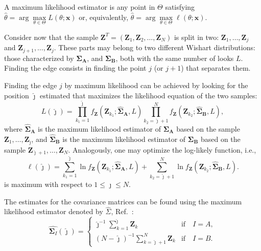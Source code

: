 \documentclass[conference]{IEEEtran}
\begin{document}
A maximum likelihood estimator is any point in $\Theta$ satisfying $\widehat{\theta}= \arg\max\limits_{\theta\in\Theta}L(\theta;\mathbf{x})$ or, equivalently, $\widehat{\theta}= \arg\max\limits_{\theta\in\Theta}\ell(\theta;\mathbf{x})$.

Consider now that the sample $\mathbf{Z}^T=(\mathbf{Z}_1,\mathbf{Z}_2,\dots,\mathbf{Z}_N)$ is split in two: $\mathbf{Z}_1,\dots,\mathbf{Z}_j$ and $\mathbf{Z}_{j+1},\dots,\mathbf{Z}_j$.
These parts may belong to two different Wishart distributions: those characterized by  $\mathbf{\Sigma_A}$, and $\mathbf{\Sigma_B}$, both with the same number of looks $L$.
Finding the edge consists in finding the point $j$ (or $j+1$) that separates them.

Finding the edge $j$ by maximum likelihood can be achieved by looking for the position $\widehat\jmath$ estimated  that maximizes the likelihood equation of the two samples:
%
\begin{equation}
	L(\widehat\jmath)=\prod_{k_1=1}^{\widehat\jmath}f_{\mathbf{Z}}(\mathbf{Z}_{k_1};\mathbf{\widehat\Sigma_{A}},L) \prod_{k_2=\widehat\jmath+1}^{N}f_{\mathbf{Z}}(\mathbf{Z}_{k_2};\mathbf{\widehat\Sigma_{B}},L),
	\label{eq_06}
\end{equation}
where $\mathbf{\widehat\Sigma_{A}}$ is the maximum likelihood estimator of $\mathbf{\Sigma_{A}}$ based on the sample $\mathbf{Z}_1,\dots,\mathbf{Z}_{\widehat\jmath}$, 
and $\mathbf{\widehat\Sigma_{B}}$ is the maximum likelihood estimator of $\mathbf{\Sigma_{B}}$ based on the sample $\mathbf{Z}_{\widehat\jmath+1},\dots,\mathbf{Z}_{N}$.
Analogously, one may optimize the log-likely function, i.e.,
\begin{equation}
\ell(\widehat\jmath) =
	\sum_{k_1=1}^{\widehat\jmath}\ln f_{\mathbf{Z}}(\mathbf{Z}_{k_1}; \mathbf{\widehat\Sigma_{A}},L) + \sum_{k_2=\widehat\jmath+1}^{N}\ln f_{\mathbf{Z}}(\mathbf{Z}_{k_2};     \mathbf{\widehat\Sigma_{B}},L).
	\label{eq_07}
\end{equation}
is maximum with respect to $1\leq \jmath \leq N$.

The estimates for the covariance matrices can be found using the maximum likelihood estimator denoted by $\widehat{\Sigma}$, Ref.~\cite{good}: 
\begin{equation}
\widehat{\mathbf\Sigma_{I}}(\widehat\jmath) = \left\{
\begin{array}{lc}
	\widehat\jmath^{-1}\sum_{k=1}^{\widehat\jmath}\mathbf{Z}_{k}  & \mbox{if}\quad I=A,  \\
        (N-\widehat\jmath)^{-1}\sum_{k=\widehat\jmath+1}^{N}\mathbf{Z}_{k} & \mbox{if}\quad I=B.
\end{array}
\right.\label{eq_08}
\end{equation}
\end{document}
